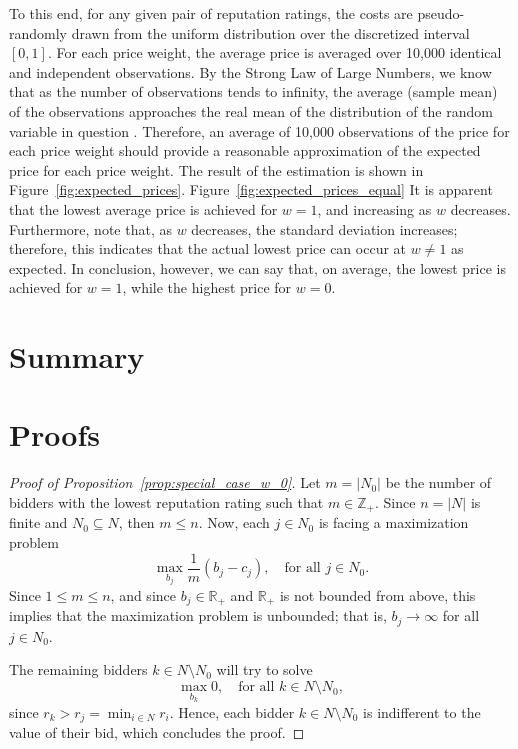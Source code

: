 To this end, for any given pair of reputation ratings, the costs are pseudo-randomly drawn from the uniform distribution over the discretized interval $[0,1]$. For each price weight, the average price is averaged over 10,000 identical and independent observations. By the Strong Law of Large Numbers, we know that as the number of observations tends to infinity, the average (sample mean) of the observations approaches the real mean of the distribution of the random variable in question \cite{LawChapter42007}. Therefore, an average of 10,000 observations of the price for each price weight should provide a reasonable approximation of the expected price for each price weight. The result of the estimation is shown in Figure~\ref{fig:expected_prices}. Figure~\ref{fig:expected_prices_equal} It is apparent that the lowest average price is achieved for $w=1$, and increasing as $w$ decreases. Furthermore, note that, as $w$ decreases, the standard deviation increases; therefore, this indicates that the actual lowest price can occur at $w\neq 1$ as expected. In conclusion, however, we can say that, on average, the lowest price is achieved for $w=1$, while the highest price for $w=0$.

\section{Summary} %
\label{sec:summary_ch2}


\section{Proofs} %
\label{sec:proofs}
\begin{proof}[Proof of Proposition~\ref{prop:special_case_w_0}]
Let $m = |N_0|$ be the number of bidders with the lowest reputation rating such that $m\in\mathbb{Z}_+$. Since $n = |N|$ is finite and $N_0\subseteq N$, then $m \le n$. Now, each $j\in N_0$ is facing a maximization problem
\begin{equation*}
	\max_{b_j} \frac{1}{m} \left(b_j - c_j \right), \quad\text{for all } j\in N_0.
\end{equation*}
Since $1\le m\le n$, and since $b_j\in\mathbb{R}_+$ and $\mathbb{R}_+$ is not bounded from above, this implies that the maximization problem is unbounded; that is, $b_j\rightarrow\infty$ for all $j\in N_0$.

The remaining bidders $k\in N\setminus N_0$ will try to solve
\begin{equation*}
	\max_{b_k} 0, \quad\text{for all } k\in N\setminus N_0,
\end{equation*}
since $r_k > r_j = \min_{i\in N} r_i$. Hence, each bidder $k\in N\setminus N_0$ is indifferent to the value of their bid, which concludes the proof.
\end{proof}

